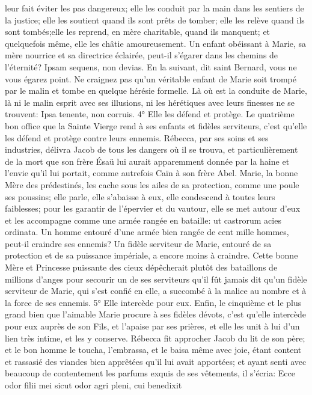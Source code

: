 leur fait éviter les pas dangereux; elle les conduit par la main dans les sentiers de la justice; elle les soutient quand
ils sont prêts de tomber; elle les relève quand ils sont tombés;elle les reprend, en mère charitable, quand ils
manquent; et quelquefois même, elle les châtie amoureusement. Un enfant obéissant à Marie, sa mère nourrice et
sa directrice éclairée, peut-il s'égarer dans les chemins de l'éternité? Ipsam sequens, non devias. En la suivant, dit
saint Bernard, vous ne vous égarez point. Ne craignez pas qu'un véritable enfant de Marie soit trompé par le malin
et tombe en quelque hérésie formelle. Là où est la conduite de Marie, là ni le malin esprit avec ses illusions, ni les
hérétiques avec leurs finesses ne se trouvent: Ipsa tenente, non corruis.
4° Elle les défend et protège.
 Le quatrième bon office que la Sainte Vierge rend à ses enfants et fidèles serviteurs, c'est qu'elle les défend
et protège contre leurs ennemis. Rébecca, par ses soins et ses industries, délivra Jacob de tous les dangers où il
se trouva, et particulièrement de la mort que son frère Ésaü lui aurait apparemment donnée par la haine et l'envie
qu'il lui portait, comme autrefois Caïn à son frère Abel. Marie, la bonne Mère des prédestinés, les cache sous les
ailes de sa protection, comme une poule ses poussins; elle parle, elle s'abaisse à eux, elle condescend à toutes
leurs faiblesses; pour les garantir de l'épervier et du vautour, elle se met autour d'eux et les accompagne comme
une armée rangée en bataille: ut castrorum acies ordinata. Un homme entouré d'une armée bien rangée de cent
mille hommes, peut-il craindre ses ennemis? Un fidèle serviteur de Marie, entouré de sa protection et de sa
puissance impériale, a encore moins à craindre. Cette bonne Mère et Princesse puissante des cieux dépêcherait
plutôt des bataillons de millions d'anges pour secourir un de ses serviteurs qu'il fût jamais dit qu'un fidèle serviteur
de Marie, qui s'est confié en elle, a succombé à la malice au nombre et à la force de ses ennemis.
5° Elle intercède pour eux.
 Enfin, le cinquième et le plus grand bien que l'aimable Marie procure à ses fidèles dévots, c'est qu'elle
intercède pour eux auprès de son Fils, et l'apaise par ses prières, et elle les unit à lui d'un lien très intime, et les y
conserve.
Rébecca fit approcher Jacob du lit de son père; et le bon homme le toucha, l'embrassa, et le baisa même avec
joie, étant content et rassasié des viandes bien apprêtées qu'il lui avait apportées; et ayant senti avec beaucoup de
contentement les parfums exquis de ses vêtements, il s'écria: Ecce odor filii mei sicut odor agri pleni, cui benedixit
